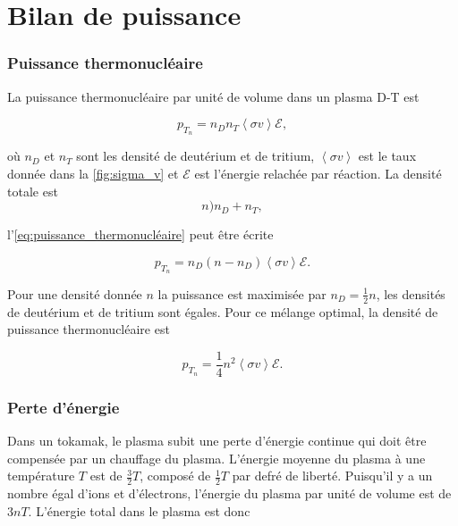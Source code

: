 \documentclass[main.tex]{subfiles}
\begin{document}
\section{Bilan de puissance}
\label{sec:bilan_de_puissance}

\subsubsection*{Puissance thermonucléaire}

La puissance thermonucléaire par unité de volume dans un plasma D-T est

\begin{equation}
	p_{T_n} = n_D n_T  \left\langle \sigma v \right\rangle \mathscr{E},
	\label{eq:puissance_thermonucléaire}
\end{equation}

où \( n_D \) et \( n_T \) sont les densité de deutérium et de tritium, \( \left\langle \sigma v \right\rangle \) est le taux donnée dans la \autoref{fig:sigma_v} et 
\( \mathscr{E} \) est l'énergie relachée par réaction.
La densité totale est
\[
	n ) n_D + n_T,
\]

l'\autoref{eq:puissance_thermonucléaire} peut être écrite

\[
	p_{T_n} = n_D \left(n - n_D\right)  \left\langle \sigma v \right\rangle \mathscr{E}.
\]

Pour une densité donnée \( n \) la puissance est maximisée par \( n_D = \frac{1}{2} n \), les densités de deutérium et de tritium sont égales.
Pour ce mélange optimal, la densité de puissance thermonucléaire est

\begin{equation}
	p_{T_n} = \frac{1}{4} n^2  \left\langle \sigma v \right\rangle \mathscr{E}
	\label{eq:puisance_thermonucleaire_2}.
\end{equation}

\subsubsection*{Perte d'énergie}

Dans un tokamak, le plasma subit une perte d’énergie continue qui doit être compensée par un chauffage du plasma.
L'énergie moyenne du plasma à une température \( T \) est de \( \frac{3}{2} T \), composé de \( \frac{1}{2} T \) par defré de liberté.
Puisqu'il y a un nombre égal d'ions et d'électrons, l'énergie du plasma par unité de volume est de \( 3 n T \).
L'énergie total dans le plasma est donc
\end{document}
